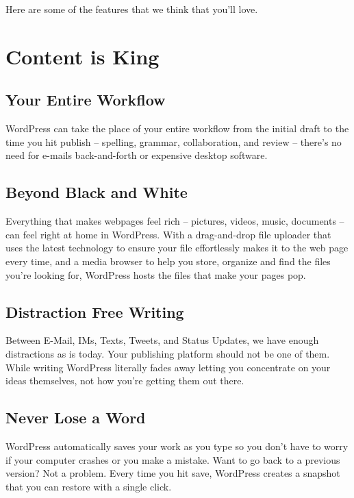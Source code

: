 Here are some of the features that we think that you'll love.



\section{Content is King}

\subsection{Your Entire Workflow}

WordPress can take the place of your entire workflow from the initial draft to the time you hit publish – spelling, grammar, collaboration, and review – there’s no need for e-mails back-and-forth or expensive desktop software.

\subsection{Beyond Black and White}

Everything that makes webpages feel rich – pictures, videos, music, documents – can feel right at home in WordPress. With a drag-and-drop file uploader that uses the latest technology to ensure your file effortlessly makes it to the web page every time, and a media browser to help you store, organize and find the files you’re looking for, WordPress hosts the files that make your pages pop.

\subsection{Distraction Free Writing}

Between E-Mail, IMs, Texts, Tweets, and Status Updates, we have enough distractions as is today. Your publishing platform should not be one of them. While writing WordPress literally fades away letting you concentrate on your ideas themselves, not how you’re getting them out there.

\subsection{Never Lose a Word}

WordPress automatically saves your work as you type so you don’t have to worry if your computer crashes or you make a mistake. Want to go back to a previous version? Not a problem. Every time you hit save, WordPress creates a snapshot that you can restore with a single click.

